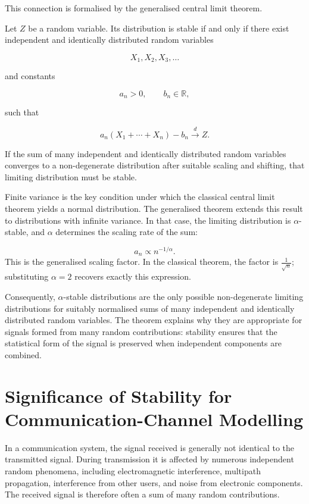 \documentclass[a4paper, 12pt, openany]{book}
\begin{document}
This connection is formalised by the generalised central limit theorem.

\begin{tcolorbox}[colback=blue!5!white,colframe=blue!50!black, title=Definition 6: Generalised central limit theorem]
\label{def:GCLI}
Let $Z$ be a random variable. Its distribution is stable if and only if there exist independent and identically distributed random variables

\[
X_1,X_2,X_3,\dots
\]

and constants

\[
a_n>0,\qquad b_n\in\mathbb{R},
\]

such that

\[
a_n(X_1+\cdots+X_n)-b_n
\overset{d}{\longrightarrow}
Z.
\]
\end{tcolorbox}
\begin{tcolorbox}[colback=yellow!5!white, colframe=orange!70!black, title=\textbf{Intuition}, fonttitle=\bfseries]
If the sum of many independent and identically distributed random variables converges to a non-degenerate distribution after suitable scaling and shifting, that limiting distribution must be stable.
\end{tcolorbox}

Finite variance is the key condition under which the classical central limit theorem yields a normal distribution. The generalised theorem extends this result to distributions with infinite variance. In that case, the limiting distribution is $\alpha$-stable, and $\alpha$ determines the scaling rate of the sum:

\[
a_n \propto n^{-1/\alpha}.
\]
This is the generalised scaling factor. In the classical theorem, the factor is $\frac{1}{\sqrt{n}}$; substituting $\alpha=2$ recovers exactly this expression.

Consequently, $\alpha$-stable distributions are the only possible non-degenerate limiting distributions for suitably normalised sums of many independent and identically distributed random variables. The theorem explains why they are appropriate for signals formed from many random contributions: stability ensures that the statistical form of the signal is preserved when independent components are combined.

\section{Significance of Stability for Communication-Channel Modelling}
In a communication system, the signal received is generally not identical to the transmitted signal. During transmission it is affected by numerous independent random phenomena, including electromagnetic interference, multipath propagation, interference from other users, and noise from electronic components. The received signal is therefore often a sum of many random contributions.
\end{document}
